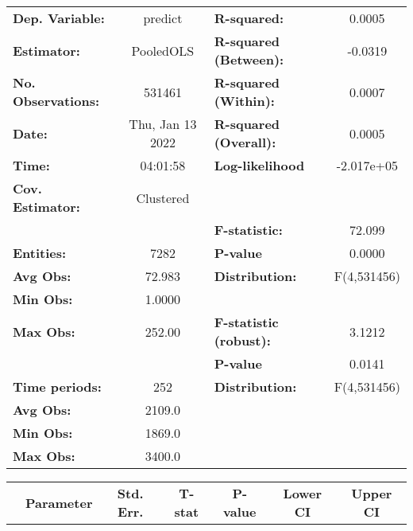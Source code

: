 \begin{center}
\begin{tabular}{lclc}
\toprule
\textbf{Dep. Variable:}    &      predict       & \textbf{  R-squared:         }   &      0.0005      \\
\textbf{Estimator:}        &     PooledOLS      & \textbf{  R-squared (Between):}  &     -0.0319      \\
\textbf{No. Observations:} &       531461       & \textbf{  R-squared (Within):}   &      0.0007      \\
\textbf{Date:}             &  Thu, Jan 13 2022  & \textbf{  R-squared (Overall):}  &      0.0005      \\
\textbf{Time:}             &      04:01:58      & \textbf{  Log-likelihood     }   &    -2.017e+05    \\
\textbf{Cov. Estimator:}   &     Clustered      & \textbf{                     }   &                  \\
\textbf{}                  &                    & \textbf{  F-statistic:       }   &      72.099      \\
\textbf{Entities:}         &        7282        & \textbf{  P-value            }   &      0.0000      \\
\textbf{Avg Obs:}          &       72.983       & \textbf{  Distribution:      }   &   F(4,531456)    \\
\textbf{Min Obs:}          &       1.0000       & \textbf{                     }   &                  \\
\textbf{Max Obs:}          &       252.00       & \textbf{  F-statistic (robust):} &      3.1212      \\
\textbf{}                  &                    & \textbf{  P-value            }   &      0.0141      \\
\textbf{Time periods:}     &        252         & \textbf{  Distribution:      }   &   F(4,531456)    \\
\textbf{Avg Obs:}          &       2109.0       & \textbf{                     }   &                  \\
\textbf{Min Obs:}          &       1869.0       & \textbf{                     }   &                  \\
\textbf{Max Obs:}          &       3400.0       & \textbf{                     }   &                  \\
\bottomrule
\end{tabular}
\begin{tabular}{lcccccc}
                & \textbf{Parameter} & \textbf{Std. Err.} & \textbf{T-stat} & \textbf{P-value} & \textbf{Lower CI} & \textbf{Upper CI}  \\

\end{tabular}
\end{center}
